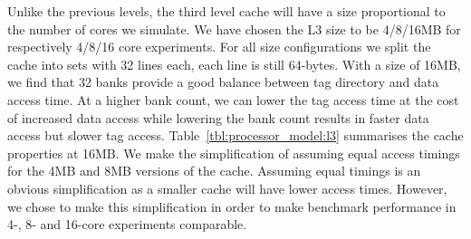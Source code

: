 Unlike the previous levels, the third level cache will have a size proportional to the number of cores we simulate. 
We have chosen the L3 size to be 4/8/16MB for respectively 4/8/16 core experiments. 
For all size configurations we split the cache into sets with 32 lines each, each line is still 64-bytes. 
With a size of 16MB, we find that 32 banks provide a good balance between tag directory and data access time. At a higher bank count, we can lower the tag access time at the cost of increased data access while lowering the bank count results in faster data access but slower tag access. 
Table~\ref{tbl:processor_model:l3} summarises the cache properties at 16MB.
We make the simplification of assuming equal access timings for the 4MB and 8MB versions of the cache. 
Assuming equal timings is an obvious simplification as a smaller cache will have lower access times.
However, we chose to make this simplification in order to make benchmark performance in 4-, 8- and 16-core experiments comparable.



